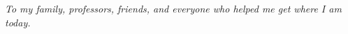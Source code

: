 \vspace{17cm}

\begin{flushright}
\itshape{To my family, professors, friends, and everyone who helped me get where I am today.}
\end{flushright}

